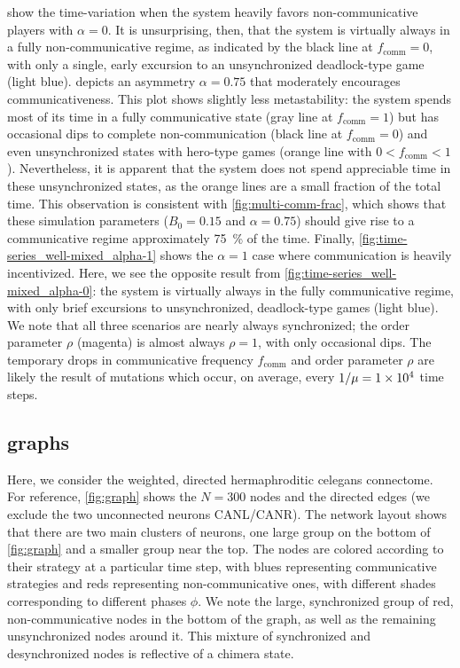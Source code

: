 \documentclass[pdflatex,twocolumn,sn-nature,super]{sn-jnl}
\begin{document}
 show the time-variation
when the system heavily favors non-communicative players
with $\alpha = 0$.
It is unsurprising, then, that the system is virtually
always in a fully non-communicative regime, as indicated by the
black line at $f_{\text{comm}} = 0$,
with only a single, early excursion to an unsynchronized
deadlock-type game (light blue).
 depicts an asymmetry $\alpha =0.75$
that moderately encourages communicativeness.
This plot shows slightly less metastability:
the system spends most of its time in a fully communicative state
(gray line at $f_{\text{comm}} = 1$)
but has occasional dips to complete non-communication
(black line at $f_{\text{comm}} = 0$)
and even unsynchronized states with hero-type games
(orange line with $0 < f_{\text{comm}} < 1$).
Nevertheless, it is apparent that the system does not spend appreciable time
in these unsynchronized states, as the orange lines are a small fraction
of the total time.
This observation is consistent with \cref{fig:multi-comm-frac},
which shows that these simulation parameters
($B_0 = 0.15$ and $\alpha = 0.75$)
should give rise to a communicative regime
approximately \SI{75}{\percent} of the time.
Finally, \cref{fig:time-series_well-mixed_alpha-1} shows the
$\alpha = 1$ case where communication is heavily incentivized.
Here, we see the opposite result from
\cref{fig:time-series_well-mixed_alpha-0}:
the system is virtually always in the fully communicative regime,
with only brief excursions to unsynchronized,
deadlock-type games (light blue).
We note that all three scenarios are nearly always synchronized;
the order parameter $\rho$ (magenta) is almost always $\rho = 1$,
with only occasional dips.
The temporary drops in communicative frequency $f_{\text{comm}}$
and order parameter $\rho$ are likely the result of mutations
which occur, on average, every $1/\mu = \num{1E4}$ time steps.

\subsection{ graphs}\label{sec:elegans_graph}

Here, we consider the weighted, directed hermaphroditic \gls{celegans} connectome.
For reference, \cref{fig:graph} shows the $N = 300$ nodes and the directed edges
(we exclude the two unconnected neurons CANL/CANR).
The network layout shows that there are two main clusters of neurons,
one large group on the bottom of \cref{fig:graph} and a smaller group
near the top.
The nodes are colored according to their strategy at a particular time step,
with blues representing communicative strategies
and reds representing non-communicative ones,
with different shades corresponding to different phases $\phi$.
We note the large, synchronized group
of red, non-communicative nodes in the bottom of the graph,
as well as the remaining unsynchronized nodes around it.
This mixture of synchronized and desynchronized nodes
is reflective of a chimera state.
\end{document}

